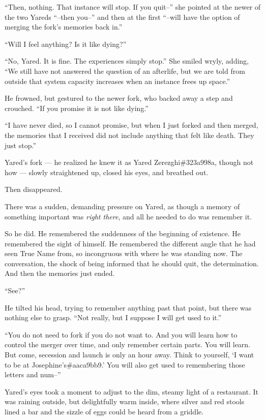 ``Then, nothing. That instance will stop. If you quit--'' she pointed at the newer of the two Yareds ``--then you--'' and then at the first ``--will have the option of merging the fork's memories back in.''

``Will I feel anything? Is it like dying?''

``No, Yared. It is fine. The experiences simply stop.'' She smiled wryly, adding, ``We still have not answered the question of an afterlife, but we are told from outside that system capacity increases when an instance frees up space.''

He frowned, but gestured to the newer fork, who backed away a step and crouched. ``If you promise it is not like dying.''

``I have never died, so I cannot promise, but when I just forked and then merged, the memories that I received did not include anything that felt like death. They just stop.''

Yared's fork — he realized he knew it as Yared Zerezghi\#323a998a, though not how — slowly straightened up, closed his eyes, and breathed out.

Then disappeared.

There was a sudden, demanding pressure on Yared, as though a memory of something important was \emph{right there}, and all he needed to do was remember it.

So he did. He remembered the suddenness of the beginning of existence. He remembered the sight of himself. He remembered the different angle that he had seen True Name from, so incongruous with where he was standing now. The conversation, the shock of being informed that he should quit, the determination. And then the memories just ended.

``See?''

He tilted his head, trying to remember anything past that point, but there was nothing else to grasp. ``Not really, but I suppose I will get used to it.''

``You do not need to fork if you do not want to. And you will learn how to control the merger over time, and only remember certain parts. You will learn. But come, secession and launch is only an hour away. Think to yourself, `I want to be at Josephine's\#aaca9bb9.' You will also get used to remembering those letters and num--''

Yared's eyes took a moment to adjust to the dim, steamy light of a restaurant. It was raining outside, but delightfully warm inside, where silver and red stools lined a bar and the sizzle of eggs could be heard from a griddle.

